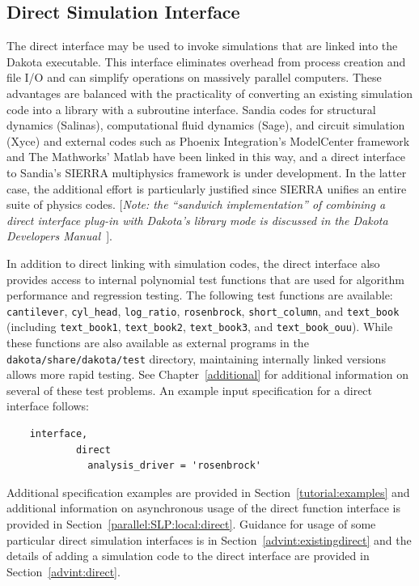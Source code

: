 \subsection{Direct Simulation Interface}\label{interfaces:direct}

The direct interface may be used to invoke
simulations that are linked into the Dakota executable. This
interface eliminates overhead from process creation and file I/O and
can simplify operations on massively parallel computers. These
advantages are balanced with the practicality of converting an
existing simulation code into a library with a subroutine
interface. Sandia codes for structural dynamics (Salinas),
computational fluid dynamics (Sage), and circuit simulation (Xyce) and
external codes such as Phoenix Integration's ModelCenter framework and
The Mathworks' Matlab have been linked in this way, and a direct
interface to Sandia's SIERRA multiphysics framework is under
development. In the latter case, the additional effort is particularly
justified since SIERRA unifies an entire suite of physics codes.
[\emph{Note: the ``sandwich implementation'' of combining a direct
interface plug-in with Dakota's library mode is discussed in the
Dakota Developers Manual~\cite{DevMan}}].

In addition to direct linking with simulation codes, the direct
interface also provides access to internal polynomial test functions
that are used for algorithm performance and regression testing. The
following test functions are available: \texttt{cantilever},
\texttt{cyl\_head}, \texttt{log\_ratio}, \texttt{rosenbrock},
\texttt{short\_column}, and \texttt{text\_book} (including
\texttt{text\_book1}, \texttt{text\_book2}, \texttt{text\_book3}, and
\texttt{text\_book\_ouu}). While these functions are also available
as external programs in the \texttt{dakota/share/dakota/test} directory,
maintaining internally linked versions allows more rapid testing. See
Chapter~\ref{additional} for additional information on several of
these test problems. An example input specification for a direct
interface follows:
\begin{small}
\begin{verbatim}
    interface,
            direct
              analysis_driver = 'rosenbrock'
\end{verbatim}
\end{small}

Additional specification examples are provided in
Section~\ref{tutorial:examples} and additional information on
asynchronous usage of the direct function interface is provided in
Section~\ref{parallel:SLP:local:direct}.  Guidance for usage of some
particular direct simulation interfaces is in
Section~\ref{advint:existingdirect} and the details of adding a
simulation code to the direct interface are provided in
Section~\ref{advint:direct}.

